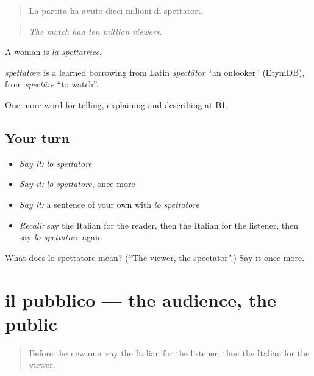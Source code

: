 \begin{quote}
La partita ha avuto dieci milioni di spettatori.
\end{quote}

\begin{quote}
\emph{The match had ten million viewers.}
\end{quote}

A woman is \emph{la spettatrice}.

\begin{cousinweb}
\emph{spettatore} is a learned borrowing from Latin \emph{spectātor} \textquotedblleft{}an onlooker\textquotedblright{} (EtymDB), from \emph{spectāre} \textquotedblleft{}to watch\textquotedblright{}.
\end{cousinweb}

\begin{grammarlens}[title={What you've built}]
One more word for telling, explaining and describing at B1.
\end{grammarlens}

\subsection*{Your turn}
\begin{itemize}
\raggedright
  \item \emph{Say it:} \emph{lo spettatore}
  \item \emph{Say it:} \emph{lo spettatore}, once more
  \item \emph{Say it:} a sentence of your own with \emph{lo spettatore}
  \item \emph{Recall:} say the Italian for the reader, then the Italian for the listener, then say \emph{lo spettatore} again
\end{itemize}

\begin{tcolorbox}[breakable,colback=teal!4,colframe=teal!35!black,title={Before you move on}]
What does lo spettatore mean? (\textquotedblleft{}The viewer, the spectator\textquotedblright{}.) Say it once more.
\end{tcolorbox}
\section[il pubblico]{il pubblico — the audience, the public}

\label{lesson:IT-C289-pubblico}



\begin{quote}
Before the new one: say the Italian for the listener, then the Italian for the viewer.
\end{quote}

